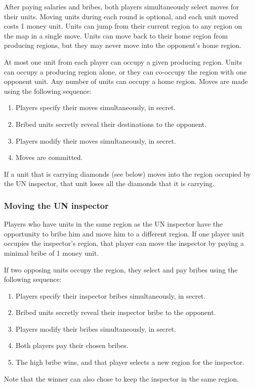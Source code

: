 \documentclass[12pt]{article}
\begin{document}
After paying salaries and bribes, both players simultaneously select moves for their units.  Moving units during each round is optional, and each unit moved costs 1 money unit.  Units can jump from their current region to any region on the map in a single move.  Units can move back to their home region from producing regions, but they may never move into the opponent's home region.

At most one unit from each player can occupy a given producing region.  Units can occupy a producing region alone, or they can co-occupy the region with one opponent unit.  Any number of units can occupy a home region.  Moves are made using the following sequence:
\begin{enumerate}
\item Players specify their moves simultaneously, in secret.
\item Bribed units secretly reveal their destinations to the opponent.
\item Players modify their moves simultaneously, in secret.
\item Moves are committed.
\end{enumerate}

If a unit that is carrying diamonds (see below) moves into the region occupied by the UN inspector, that unit loses all the diamonds that it is carrying.


\subsubsection{Moving the UN inspector}

Players who have units in the same region as the UN inspector have the opportunity to bribe him and move him to a different region.  If one player unit occupies the inspector's region, that player can move the inspector by paying a minimal bribe of 1 money unit.

If two opposing units occupy the region, they select and pay bribes using the following sequence:
\begin{enumerate}
\item Players specify their inspector bribes simultaneously, in secret.
\item Bribed units secretly reveal their inspector bribe to the opponent.
\item Players modify their bribes simultaneously, in secret.
\item Both players pay their chosen bribes.
\item The high bribe wins, and that player selects a new region for the inspector.
\end{enumerate}
Note that the winner can also chose to keep the inspector in the same region.
\end{document}
